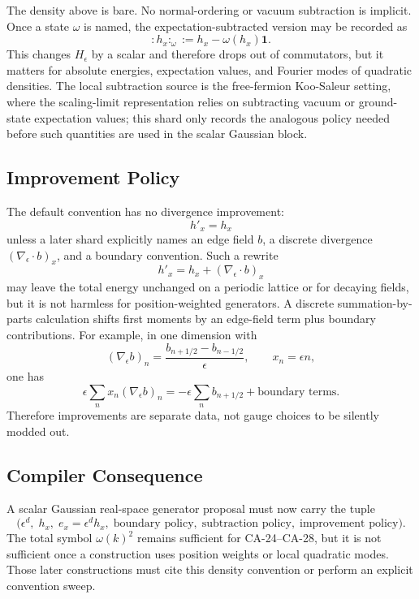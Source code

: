 The density above is bare.  No normal-ordering or vacuum subtraction is
implicit.  Once a state \(\omega\) is named, the expectation-subtracted version
may be recorded as
\[
  {:}h_x{:}_\omega:=h_x-\omega(h_x)\mathbf 1 .
\]
This changes \(H_\epsilon\) by a scalar and therefore drops out of commutators,
but it matters for absolute energies, expectation values, and Fourier modes of
quadratic densities.  The local subtraction source is the free-fermion
Koo-Saleur setting, where the scaling-limit representation relies on subtracting
vacuum or ground-state expectation values; this shard only records the analogous
policy needed before such quantities are used in the scalar Gaussian block.

\subsection{Improvement Policy}

The default convention has no divergence improvement:
\[
  h'_x=h_x
\]
unless a later shard explicitly names an edge field \(b\), a discrete divergence
\((\nabla_\epsilon\cdot b)_x\), and a boundary convention.  Such a rewrite
\[
  h'_x=h_x+(\nabla_\epsilon\cdot b)_x
\]
may leave the total energy unchanged on a periodic lattice or for decaying
fields, but it is not harmless for position-weighted generators.  A discrete
summation-by-parts calculation shifts first moments by an edge-field term plus
boundary contributions.  For example, in one dimension with
\[
  (\nabla_\epsilon b)_n
  =
  \frac{b_{n+1/2}-b_{n-1/2}}{\epsilon},
  \qquad x_n=\epsilon n,
\]
one has
\[
  \epsilon\sum_n x_n(\nabla_\epsilon b)_n
  =
  -\epsilon\sum_n b_{n+1/2}
  +\text{boundary terms}.
\]
Therefore improvements are separate data, not gauge choices to be silently
modded out.

\subsection{Compiler Consequence}

A scalar Gaussian real-space generator proposal must now carry the tuple
\[
\bigl(\epsilon^d,\; h_x,\; e_x=\epsilon^dh_x,\;
  \text{boundary policy},\; \text{subtraction policy},\;
  \text{improvement policy}\bigr).
\]
The total symbol \(\omega(k)^2\) remains sufficient for CA-24--CA-28, but it is
not sufficient once a construction uses position weights or local quadratic
modes.  Those later constructions must cite this density convention or perform
an explicit convention sweep.
